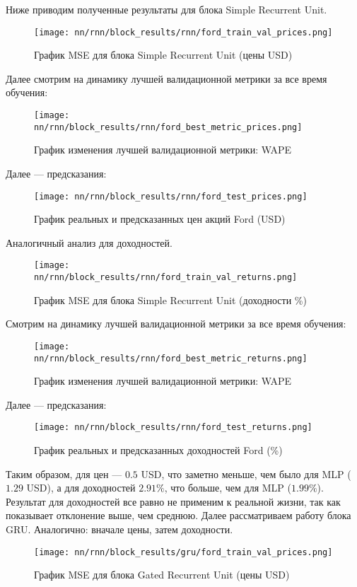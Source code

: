 Ниже приводим полученные результаты для блока Simple Recurrent Unit.
\begin{figure}[H]
	\centering
	\texttt{[image: nn/rnn/block\_results/rnn/ford\_train\_val\_prices.png]}
	\caption{График MSE для блока Simple Recurrent Unit (цены USD)}
	\label{fig::rnn_ford_train_val_prices}
\end{figure}
\noindent Далее смотрим на динамику лучшей валидационной метрики за все время обучения:
\begin{figure}[H]
	\centering
	\texttt{[image: nn/rnn/block\_results/rnn/ford\_best\_metric\_prices.png]}
	\caption{График изменения лучшей валидационной метрики: WAPE}
	\label{fig::rnn_ford_best_metric_prices}
\end{figure}
\noindent Далее --- предсказания:
\begin{figure}[H]
	\centering
	\texttt{[image: nn/rnn/block\_results/rnn/ford\_test\_prices.png]}
	\caption{График реальных и предсказанных цен акций Ford (USD)}
	\label{fig::rnn_ford_test_prices}
\end{figure}
\noindent Аналогичный анализ для доходностей.
\begin{figure}[H]
	\centering
	\texttt{[image: nn/rnn/block\_results/rnn/ford\_train\_val\_returns.png]}
	\caption{График MSE для блока Simple Recurrent Unit (доходности \%)}
	\label{fig::rnn_ford_train_val_returns}
\end{figure}
\noindent Смотрим на динамику лучшей валидационной метрики за все время обучения:
\begin{figure}[H]
	\centering
	\texttt{[image: nn/rnn/block\_results/rnn/ford\_best\_metric\_returns.png]}
	\caption{График изменения лучшей валидационной метрики: WAPE}
	\label{fig::rnn_ford_best_metric_returns}
\end{figure}
\noindent Далее --- предсказания:
\begin{figure}[H]
	\centering
	\texttt{[image: nn/rnn/block\_results/rnn/ford\_test\_returns.png]}
	\caption{График реальных и предсказанных доходностей Ford (\%)}
	\label{fig::rnn_ford_test_returns}
\end{figure}
\noindent Таким образом, для цен --- $0.5$ USD, что заметно меньше, чем было для MLP ($1.29$ USD), а для доходностей $2.91\%$, что больше, чем для MLP ($1.99\%$). Результат для доходностей все равно не применим к реальной жизни, так как показывает отклонение выше, чем среднюю. Далее рассматриваем работу блока GRU. Аналогично: вначале цены, затем доходности.
\begin{figure}[H]
	\centering
	\texttt{[image: nn/rnn/block\_results/gru/ford\_train\_val\_prices.png]}
	\caption{График MSE для блока Gated Recurrent Unit (цены USD)}
	\label{fig::gru_ford_train_val_prices}
\end{figure}
